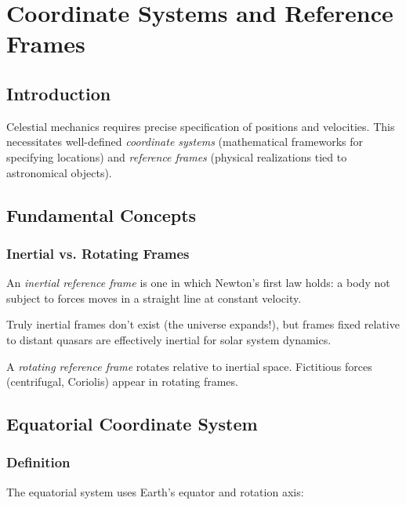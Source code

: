 \chapter{Coordinate Systems and Reference Frames}
\label{ch:coordinate_systems}

\section{Introduction}

Celestial mechanics requires precise specification of positions and velocities. This necessitates well-defined \textit{coordinate systems} (mathematical frameworks for specifying locations) and \textit{reference frames} (physical realizations tied to astronomical objects).

\section{Fundamental Concepts}

\subsection{Inertial vs. Rotating Frames}

\begin{definition}
An \textit{inertial reference frame} is one in which Newton's first law holds: a body not subject to forces moves in a straight line at constant velocity.
\end{definition}

Truly inertial frames don't exist (the universe expands!), but frames fixed relative to distant quasars are effectively inertial for solar system dynamics.

\begin{definition}
A \textit{rotating reference frame} rotates relative to inertial space. Fictitious forces (centrifugal, Coriolis) appear in rotating frames.
\end{definition}

\section{Equatorial Coordinate System}

\subsection{Definition}

The equatorial system uses Earth's equator and rotation axis:

